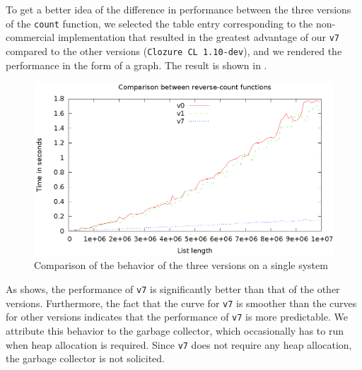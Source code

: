To get a better idea of the difference in performance between the
three versions of the \texttt{count} function, we selected the table
entry corresponding to the non-commercial implementation that resulted
in the greatest advantage of our \texttt{v7} compared to the other
versions (\texttt{Clozure CL 1.10-dev}), and we rendered the
performance in the form of a graph.  The result is shown in
.

\begin{figure}[htb]
\centering
\includegraphics{v0-v1-v7.eps}
\caption{\label{f-versions} Comparison of the behavior of the three versions on a single system}
\end{figure}

As  shows, the performance of \texttt{v7} is
significantly better than that of the other versions.  Furthermore,
the fact that the curve for \texttt{v7} is smoother than the curves
for other versions indicates that the performance of \texttt{v7} is
more predictable.  We attribute this behavior to the garbage
collector, which occasionally has to run when heap allocation is
required.  Since \texttt{v7} does not require any heap allocation, the
garbage collector is not solicited.

